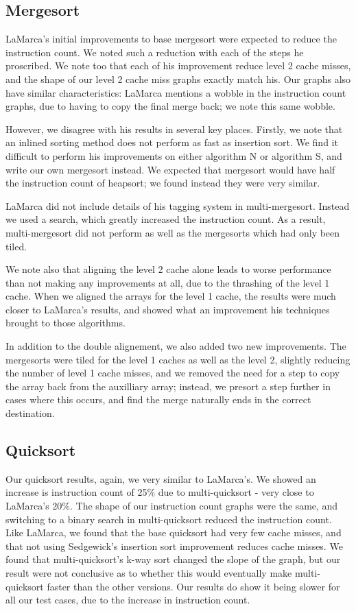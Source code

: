 \subsection{Mergesort}

LaMarca's initial improvements to base mergesort were expected to reduce the
instruction count. We noted such a reduction with each of the steps he
proscribed. We note too that each of his improvement reduce level 2 cache
misses, and the shape of our level 2 cache miss graphs exactly match his. Our
graphs also have similar characteristics: LaMarca mentions a wobble in the
instruction count graphs, due to having to copy the final merge back; we note
this same wobble.

However, we disagree with his results in several key places. Firstly, we note
that an inlined sorting method does not perform as fast as insertion sort. We
find it difficult to perform his improvements on either algorithm N or algorithm
S, and write our own mergesort instead. We expected that mergesort would have
half the instruction count of heapsort; we found instead they were very similar.

LaMarca did not include details of his tagging system in multi-mergesort.
Instead we used a search, which greatly increased the instruction count. As a
result, multi-mergesort did not perform as well as the mergesorts which had only
been tiled. 

We note also that aligning the level 2 cache alone leads to worse performance
than not making any improvements at all, due to the thrashing of the level 1
cache. When we aligned the arrays for the level 1 cache, the results were much
closer to LaMarca's results, and showed what an improvement his techniques
brought to those algorithms.

In addition to the double alignement, we also added two new improvements. The
mergesorts were tiled for the level 1 caches as well as the level 2, slightly
reducing the number of level 1 cache misses, and we removed the need for a step
to copy the array back from the auxilliary array; instead, we presort a step
further in cases where this occurs, and find the merge naturally ends in the
correct destination.


\subsection{Quicksort}

Our quicksort results, again, we very similar to LaMarca's. We showed an
increase is instruction count of 25\% due to multi-quicksort - very close to
LaMarca's 20\%. The shape of our instruction count graphs were the same, and
switching to a binary search in multi-quicksort reduced the instruction count.
Like LaMarca, we found that the base quicksort had very few cache misses, and
that not using Sedgewick's insertion sort improvement reduces cache misses. We
found that multi-quicksort's k-way sort changed the slope of the graph, but our
result were not conclusive as to whether this would eventually make
multi-quicksort faster than the other versions. Our results do show it being
slower for all our test cases, due to the increase in instruction count.

